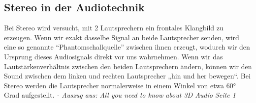\newpage
\subsection{Stereo in der Audiotechnik}


Bei Stereo wird versucht, mit 2 Lautsprechern ein frontales Klangbild zu erzeugen. Wenn wir exakt dasselbe Signal an beide Lautsprecher senden, wird eine so genannte “Phantomschallquelle” zwischen ihnen erzeugt, wodurch wir den Ursprung dieses Audiosignals direkt vor uns wahrnehmen. Wenn wir das Lautstärkenverhältnis zwischen den beiden Lautsprechern ändern, können wir den Sound  zwischen dem linken und rechten Lautsprecher „hin und her bewegen“. Bei Stereo werden die Lautsprecher normalerweise in einem Winkel von etwa 60° Grad aufgestellt.  \textit{- Auszug aus: All you need to know about 3D Audio Seite 1} \cite{3DAudio_St:online}
